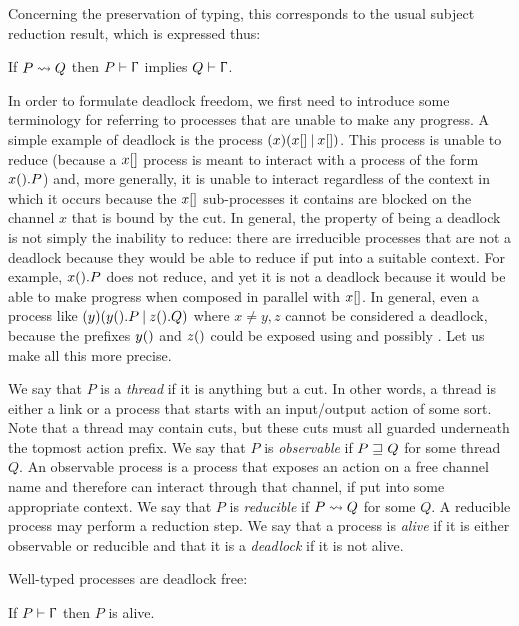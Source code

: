 Concerning the preservation of typing, this corresponds to the usual subject
reduction result, which is expressed thus:

\begin{theorem}
    \label{thm:red}
    If $P \leadsto Q$ then $\wtp{P}\Context$ implies $\wtp{Q}\Context$.
\end{theorem}

In order to formulate deadlock freedom, we first need to introduce some
terminology for referring to processes that are unable to make any progress. A
simple example of deadlock is the process $(x)(x[]\mathbin|x[])$. This
process is unable to reduce (because a $x[]$ process is meant to interact
with a process of the form $x().P$) and, more generally, it is unable to
interact regardless of the context in which it occurs because the $x[]$
sub-processes it contains are blocked on the channel $x$ that is bound by the
cut.
%
In general, the property of being a deadlock is not simply the inability to
reduce: there are irreducible processes that are not a deadlock because they
would be able to reduce if put into a suitable context. For example, $x().P$
does not reduce, and yet it is not a deadlock because it would be able to make
progress when composed in parallel with $x[]$. In general, even a process
like $(y)(y().P\mathbin|z().Q)$ where $x\ne y,z$ cannot be considered a
deadlock, because the prefixes $y()$ and $z()$ could be exposed using
\SWait and possibly \SComm. Let us make all this more precise.

We say that $P$ is a \emph{thread} if it is anything but a cut. In other words,
a thread is either a link or a process that starts with an input/output action
of some sort. Note that a thread may contain cuts, but these cuts must all
guarded underneath the topmost action prefix.
%
We say that $P$ is \emph{observable} if $P \sqsupseteq Q$ for some thread $Q$. An
observable process is a process that exposes an action on a free channel name
and therefore can interact through that channel, if put into some appropriate
context. We say that $P$ is \emph{reducible} if $P \leadsto Q$ for some $Q$. A
reducible process may perform a reduction step.
%
We say that a process is \emph{alive} if it is either observable or reducible
and that it is a \emph{deadlock} if it is not alive.

Well-typed \Calculus processes are deadlock free:

\begin{theorem}
    \label{thm:df}
    If $\wtp{P}\Context$ then $P$ is alive.
\end{theorem}

